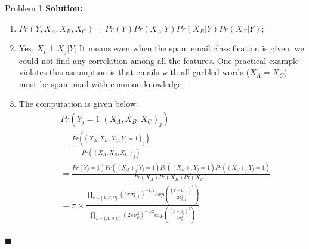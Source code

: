 \documentclass{article}
\newenvironment{solution}                               %
{\textbf{Solution:} }{$\blacksquare$}                   %
\begin{document}
\begin{section}{Problem 1}
        \begin{solution}
           \begin{enumerate}[label=(\alph*)]
               \item $Pr(Y, X_A, X_B, X_C) = Pr(Y) Pr(X_A|Y) Pr(X_B|Y) Pr(X_C|Y)$;
               \item Yes, $X_i \perp X_j | Y$; It means even when the spam email classification is given, we could not find any correlation among all the features. One practical example violates this assumption is that emails with all garbled words ($X_A = X_C$) must be spam mail with common knowledge;
               \item The computation is given below:
                    \begin{align*}
                        & Pr(Y_j=1 | (X_A, X_B, X_C)_j) \\
                        &= \frac{Pr((X_A, X_B, X_C, Y_j=1)_j)}{Pr((X_A, X_B, X_C)_j)} \\
                        &= \frac
                            {Pr(Y_j=1) Pr((X_A)_j|Y_j=1) Pr((X_B)_j|Y_j=1) Pr((X_C)_j|Y_j=1)}
                            {Pr(X_A) Pr(X_B) Pr(X_C)} \\
                        &= \pi \times
                            \frac
                            {
                                \prod_{k=\{A,B,C\}} (2\pi \sigma_{k,1}^2)^{-1/2}exp(\frac{(x-\mu_{k,1})^2}{2 \sigma_{k,1}^2})
                            }
                            {
                                \prod_{k=\{A,B,C\}} (2\pi \sigma_{k}^2)^{-1/2}exp(\frac{(x-\mu_{k})^2}{2 \sigma_{k}^2})
                            }
                    \end{align*}
           \end{enumerate}
        \end{solution}


\end{section}
\end{document}
